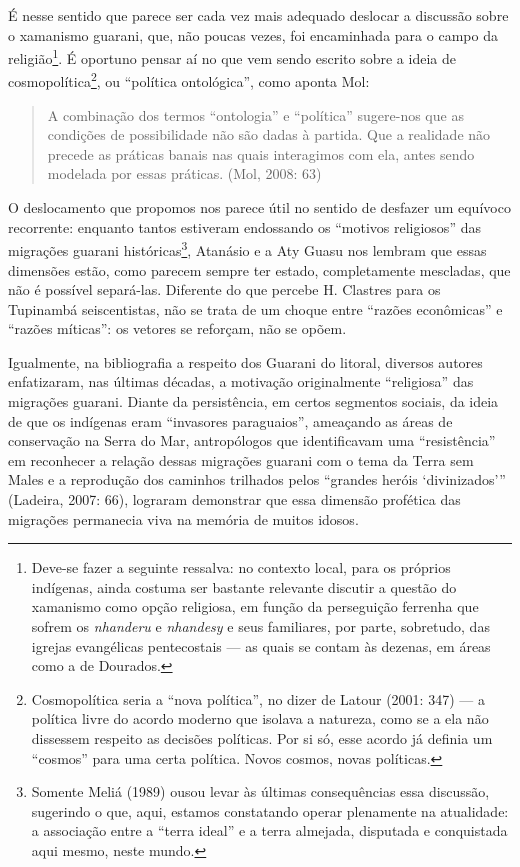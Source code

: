 É nesse sentido que parece ser cada vez mais adequado deslocar a
discussão sobre o xamanismo guarani, que, não poucas vezes, foi
encaminhada para o campo da religião\footnote{Deve-se fazer a seguinte
ressalva: no contexto local, para os próprios indígenas, ainda costuma
ser bastante relevante discutir a questão do xamanismo como opção
religiosa, em função da perseguição ferrenha que sofrem os \emph{nhanderu} e
\emph{nhandesy} e seus familiares, por parte, sobretudo, das igrejas
evangélicas pentecostais --- as quais se contam às dezenas, em áreas como
a de Dourados.}. É oportuno pensar aí no que vem sendo escrito sobre
a ideia de cosmopolítica\footnote{Cosmopolítica seria a ``nova
política'', no dizer de Latour (2001: 347) --- a política livre do acordo
moderno que isolava a natureza, como se a ela não dissessem respeito as
decisões políticas. Por si só, esse acordo já definia um ``cosmos'' para
uma certa política. Novos cosmos, novas políticas.}, ou ``política
ontológica'', como aponta Mol: 

\begin{quotation}
A combinação dos termos ``ontologia'' e ``política'' sugere-nos que as
condições de possibilidade não são dadas à partida. Que a realidade não
precede as práticas banais nas quais interagimos com ela, antes sendo
modelada por essas práticas. (Mol, 2008: 63)
\end{quotation}

O deslocamento que propomos nos parece útil no sentido de desfazer um
equívoco recorrente: enquanto tantos estiveram endossando os ``motivos
religiosos'' das migrações guarani históricas\footnote{Somente Meliá
(1989) ousou levar às últimas consequências essa discussão, sugerindo o
que, aqui, estamos constatando operar plenamente na atualidade: a
associação entre a ``terra ideal'' e a terra almejada, disputada e
conquistada aqui mesmo, neste mundo.}, Atanásio e a Aty Guasu nos
lembram que essas dimensões estão, como parecem sempre ter estado,
completamente mescladas, que não é possível separá-las. Diferente do
que percebe H. Clastres para os Tupinambá seiscentistas, não se trata
de um choque entre ``razões econômicas'' e ``razões míticas'': os vetores
se reforçam, não se opõem.

Igualmente, na bibliografia a respeito dos Guarani do litoral, diversos
autores enfatizaram, nas últimas décadas, a motivação originalmente
``religiosa'' das migrações guarani. Diante da persistência, em certos
segmentos sociais, da ideia de que os indígenas eram ``invasores
paraguaios'', ameaçando as áreas de conservação na Serra do Mar,
antropólogos que identificavam uma ``resistência'' em reconhecer a
relação dessas migrações guarani com o tema da Terra sem Males e a
reprodução dos caminhos trilhados pelos ``grandes heróis ‘divinizados’''
(Ladeira, 2007: 66), lograram demonstrar que essa dimensão profética
das migrações permanecia viva na memória de muitos idosos. 

